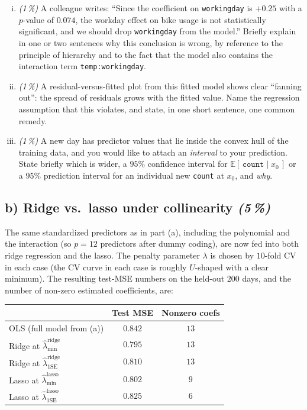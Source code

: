 \documentclass[11pt,a4paper]{article}
\newcommand{\subpoints}[1]{\textit{(#1\,\%)}}
\begin{document}
\begin{enumerate}[(i)]
  \item \subpoints{1} A colleague writes: ``Since the coefficient on \texttt{workingday} is $+0.25$ with a $p$-value of $0.074$, the workday effect on bike usage is not statistically significant, and we should drop \texttt{workingday} from the model.'' Briefly explain in one or two sentences why this conclusion is wrong, by reference to the principle of hierarchy and to the fact that the model also contains the interaction term \texttt{temp:workingday}.

  \item \subpoints{1} A residual-versus-fitted plot from this fitted model shows clear ``fanning out'': the spread of residuals grows with the fitted value. Name the regression assumption that this violates, and state, in one short sentence, one common remedy.

  \item \subpoints{1} A new day has predictor values that lie inside the convex hull of the training data, and you would like to attach an \emph{interval} to your prediction. State briefly which is wider, a $95\%$ confidence interval for $\mathbb{E}[\,\texttt{count} \mid x_0\,]$ or a $95\%$ prediction interval for an individual new \texttt{count} at $x_0$, and \emph{why}.
\end{enumerate}

\subsection*{b) Ridge vs.\ lasso under collinearity \subpoints{5}}

The same standardized predictors as in part (a), including the polynomial and the interaction (so $p = 12$ predictors after dummy coding), are now fed into both ridge regression and the lasso. The penalty parameter $\lambda$ is chosen by $10$-fold CV in each case (the CV curve in each case is roughly $U$-shaped with a clear minimum). The resulting test-MSE numbers on the held-out $200$ days, and the number of non-zero estimated coefficients, are:

\begin{center}\small
\begin{tabular}{lcc}
\toprule
                                                & \textbf{Test MSE} & \textbf{Nonzero coefs} \\
\midrule
OLS (full model from (a))                       & $0.842$           & $13$ \\
Ridge at $\hat\lambda_{\min}^{\text{ridge}}$    & $0.795$           & $13$ \\
Ridge at $\hat\lambda_{1\mathrm{SE}}^{\text{ridge}}$ & $0.810$       & $13$ \\
Lasso at $\hat\lambda_{\min}^{\text{lasso}}$    & $0.802$           & $9$  \\
Lasso at $\hat\lambda_{1\mathrm{SE}}^{\text{lasso}}$ & $0.825$       & $6$  \\
\bottomrule
\end{tabular}
\end{center}
\end{document}
